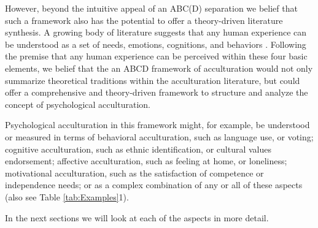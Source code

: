 \documentclass[nobib]{tufte-handout}
\begin{document}
 However, beyond the intuitive appeal of an ABC(D) separation we belief that such a framework also has the potential to offer a theory-driven literature synthesis. A growing body of literature suggests that any human experience can be understood as a set of needs, emotions, cognitions, and behaviors \citep[sometimes referred to as the ABCs or ABCDs of psychology: affect, behavior, cognition, desire; e.g.,][]{Cottam2010, Hogg2005, Jhangiani2014}. Following the premise that any human experience can be perceived within these four basic elements, we belief that the an ABCD framework of acculturation would not only summarize theoretical traditions within the acculturation literature, but could offer a comprehensive and theory-driven framework to structure and analyze the concept of psychological acculturation.

 Psychological acculturation in this framework might, for example, be understood or measured in terms of behavioral acculturation, such as language use, or voting; cognitive acculturation, such as ethnic identification, or cultural values endorsement; affective acculturation, such as feeling at home, or loneliness; motivational acculturation, such as the satisfaction of competence or independence needs; or as a complex combination of any or all of these aspects (also see Table \ref{tab:Examples}1). 



\newpage
In the next sections we will look at each of the aspects in more detail.
\end{document}
